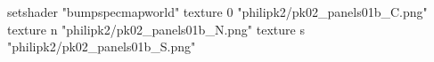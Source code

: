 setshader "bumpspecmapworld"
    texture 0 "philipk2/pk02_panels01b_C.png"
    texture n "philipk2/pk02_panels01b_N.png"
    texture s "philipk2/pk02_panels01b_S.png"